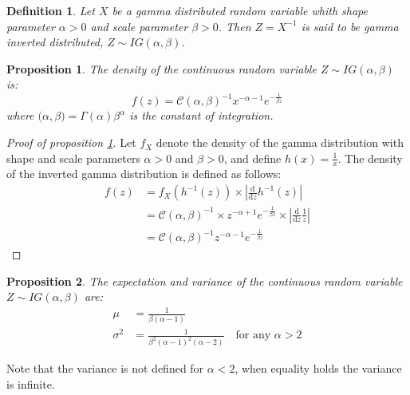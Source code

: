 \documentclass{amsart}
\theoremstyle{plain}
\newtheorem{proposition}{Proposition}[section]
\newtheorem{definition}{Definition}[section]
\theoremstyle{remark}
\numberwithin{equation}{section}
\begin{document}
\begin{definition}
  Let $X$ be a gamma distributed random variable whith shape parameter $\alpha>0$ and scale parameter $\beta>0$. Then $Z = X^{-1}$ is said to be gamma inverted distributed, $Z\sim IG(\alpha, \beta)$.
\end{definition}

\begin{proposition}\label{InvertedGammaDensity}
  The density of the continuous random variable $Z\sim IG(\alpha,\beta)$ is:
  \[
    f(z) = \mathcal C (\alpha, \beta)^{-1}x^{-\alpha-1}e^{-\frac{1}{\beta z}}
  \]
  where $\mathcal (\alpha, \beta) = \Gamma(\alpha)\beta^{\alpha}$ is the constant of integration.
\end{proposition}

\begin{proof}[Proof of proposition \ref{InvertedGammaDensity}]
  Let $f_X$ denote the density of the gamma distribution with shape and scale parameters $\alpha>0$ and $\beta>0$, and define $h(x) = \frac{1}{x}$. The density of the inverted gamma distribution is defined as follows:
  \[
    \begin{split}
      f(z) &= f_X(h^{-1}(z)) \times \left|\frac{\mathrm d}{\mathrm dz}h^{-1}(z)\right|\\
      &= \mathcal C(\alpha, \beta)^{-1} \times z^{-\alpha+1}e^{-\frac{1}{\beta z}} \times \left|\frac{\mathrm d}{\mathrm dz}\frac{1}{z}\right|\\
      &= \mathcal C(\alpha, \beta)^{-1} z^{-\alpha-1}e^{-\frac{1}{\beta z}}
    \end{split}
  \]
\end{proof}

\begin{proposition}\label{InvertedGammaMoments}
  The expectation and variance of the continuous random variable $Z\sim IG(\alpha,\beta)$ are:
  \[
    \begin{split}
      \mu &= \frac{1}{\beta(\alpha-1)}\\
      \sigma^2 &= \frac{1}{\beta^2(\alpha-1)^2(\alpha-2)} \quad\text{for any }\alpha>2
    \end{split}
  \]
\end{proposition}

Note that the variance is not defined for $\alpha<2$, when equality holds the variance is infinite.\newline
\end{document}
